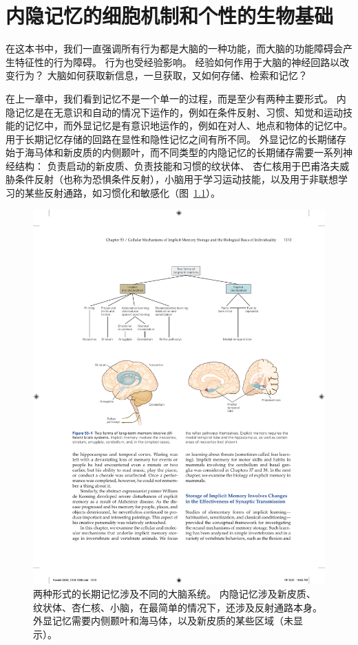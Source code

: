 \chapter{内隐记忆的细胞机制和个性的生物基础} \label{chap:chap53}

在这本书中，我们一直强调所有行为都是大脑的一种功能，而大脑的功能障碍会产生特征性的行为障碍。
行为也受经验影响。
经验如何作用于大脑的神经回路以改变行为？
大脑如何获取新信息，一旦获取，又如何存储、检索和记忆？


在上一章中，我们看到记忆不是一个单一的过程，而是至少有两种主要形式。
内隐记忆是在无意识和自动的情况下运作的，例如在条件反射、习惯、知觉和运动技能的记忆中，而外显记忆是有意识地运作的，例如在对人、地点和物体的记忆中。
用于长期记忆存储的回路在显性和隐性记忆之间有所不同。
外显记忆的长期储存始于海马体和新皮质的内侧颞叶，而不同类型的内隐记忆的长期储存需要一系列神经结构：
负责启动的新皮质、负责技能和习惯的纹状体、 杏仁核用于巴甫洛夫威胁条件反射（也称为恐惧条件反射），小脑用于学习运动技能，以及用于非联想学习的某些反射通路，如习惯化和敏感化（图~\ref{fig:53_1}）。


\begin{figure}[htbp]
	\centering
	\includegraphics[width=0.7\linewidth]{chap53/fig_53_1}
	\caption{两种形式的长期记忆涉及不同的大脑系统。 内隐记忆涉及新皮质、纹状体、杏仁核、小脑，在最简单的情况下，还涉及反射通路本身。 外显记忆需要内侧颞叶和海马体，以及新皮质的某些区域（未显示）。}
	\label{fig:53_1}
\end{figure}



